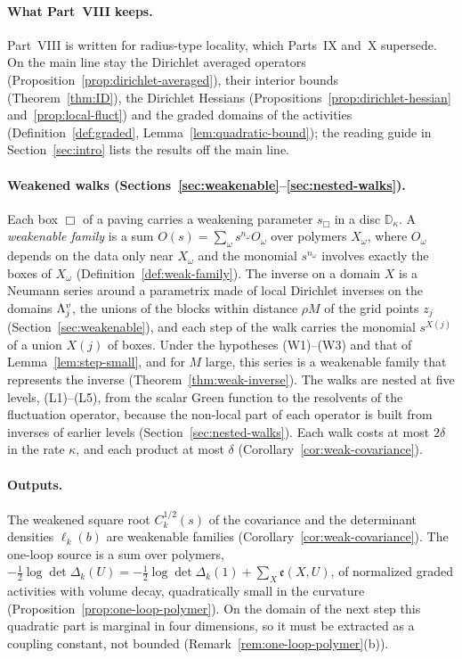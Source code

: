 \paragraph{What Part~VIII keeps.} Part~VIII is written for radius-type locality, which Parts~IX and~X supersede. On the main line stay the Dirichlet averaged operators (Proposition~\ref{prop:dirichlet-averaged}), their interior bounds (Theorem~\ref{thm:ID}), the Dirichlet Hessians (Propositions~\ref{prop:dirichlet-hessian} and~\ref{prop:local-fluct}) and the graded domains of the activities (Definition~\ref{def:graded}, Lemma~\ref{lem:quadratic-bound}); the reading guide in Section~\ref{sec:intro} lists the results off the main line.

\paragraph{Weakened walks (Sections~\ref{sec:weakenable}--\ref{sec:nested-walks}).} Each box $\Box$ of a paving carries a weakening parameter $s_\Box$ in a disc $\mathbb D_\kappa$. A \emph{weakenable family} is a sum $O(s)=\sum_\omega s^{n_\omega}O_\omega$ over polymers $X_\omega$, where $O_\omega$ depends on the data only near $X_\omega$ and the monomial $s^{n_\omega}$ involves exactly the boxes of $X_\omega$ (Definition~\ref{def:weak-family}). The inverse on a domain $X$ is a Neumann series around a parametrix made of local Dirichlet inverses on the domains $\Lambda^v_j$, the unions of the blocks within distance $\rho M$ of the grid points $z_j$ (Section~\ref{sec:weakenable}), and each step of the walk carries the monomial $s^{X(j)}$ of a union $X(j)$ of boxes. Under the hypotheses (W1)--(W3) and that of Lemma~\ref{lem:step-small}, and for $M$ large, this series is a weakenable family that represents the inverse (Theorem~\ref{thm:weak-inverse}). The walks are nested at five levels, (L1)--(L5), from the scalar Green function to the resolvents of the fluctuation operator, because the non-local part of each operator is built from inverses of earlier levels (Section~\ref{sec:nested-walks}). Each walk costs at most $2\delta$ in the rate $\kappa$, and each product at most $\delta$ (Corollary~\ref{cor:weak-covariance}).

\paragraph{Outputs.} The weakened square root $C_k^{1/2}(s)$ of the covariance and the determinant densities $\ell_k(b)$ are weakenable families (Corollary~\ref{cor:weak-covariance}). The one-loop source is a sum over polymers, $-\frac12\log\det\Delta_k(U)=-\frac12\log\det\Delta_k(1)+\sum_X\mathfrak e(X,U)$, of normalized graded activities with volume decay, quadratically small in the curvature (Proposition~\ref{prop:one-loop-polymer}). On the domain of the next step this quadratic part is marginal in four dimensions, so it must be extracted as a coupling constant, not bounded (Remark~\ref{rem:one-loop-polymer}(b)).

